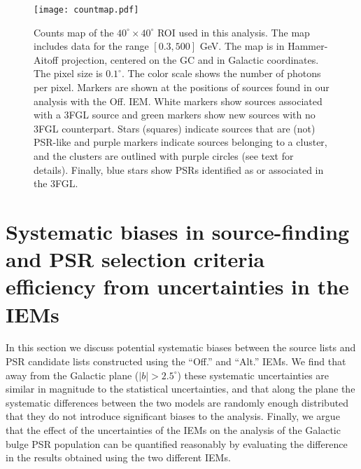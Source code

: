 \documentclass[iop]{emulateapj}
\newcommand{\newtext}[1]{{\color{blue}{#1}}}
\begin{document}
\begin{figure}
	\centering
\texttt{[image: countmap.pdf]}
\caption{Counts map of the $40^{\circ}\times 40^{\circ}$ ROI used in
  this analysis.  The map includes data for the range $[0.3,500]$ GeV.
  The map is in Hammer-Aitoff projection, centered on the GC and in Galactic
  coordinates.  The pixel size is $0.1^{\circ}$. The color scale shows
  the number of photons per pixel. Markers are shown at the positions
  of sources found in our analysis with the Off. IEM.  White markers show
  sources associated with a 3FGL source and green markers show new sources
  with no 3FGL counterpart.  Stars (squares) indicate sources that are
  (not) PSR-like and purple markers indicate sources belonging
  to a cluster, and the clusters are outlined with purple circles (see text for details). 
  Finally, blue stars show PSRs identified as or associated in the 3FGL.}
\label{fig:map} 
\end{figure}





\section{Systematic biases in source-finding and
  PSR selection criteria efficiency from uncertainties in the IEMs}
\label{sec:systsource}

In this section we discuss potential systematic biases
  between the source lists and PSR candidate lists constructed using
  the ``Off.'' and ``Alt.'' IEMs.  We find that away from the Galactic
  plane ($|b| > 2.5^\circ$) these systematic uncertainties are
  similar in magnitude to the statistical uncertainties, and that along the
  plane the systematic differences between the two models are randomly
  enough distributed that they do not introduce significant biases to
  the analysis.  Finally, we argue that the effect of the
  uncertainties of the IEMs on the analysis of the Galactic bulge PSR
  population can be quantified reasonably by evaluating the difference
  in the results obtained using the two different IEMs.
\end{document}
